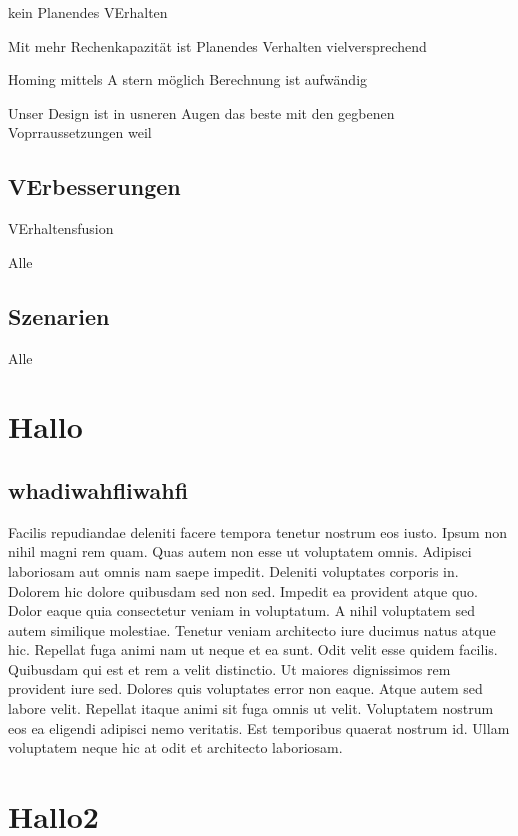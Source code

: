 \documentclass[
a4paper,     %
12pt         %
]{scrartcl}  %
\begin{document}
kein Planendes VErhalten

Mit mehr Rechenkapazität ist Planendes Verhalten vielversprechend


Homing mittels A stern möglich
Berechnung ist aufwändig

Unser Design ist in usneren Augen das beste mit den gegbenen Voprraussetzungen weil




\subsection{VErbesserungen}

VErhaltensfusion

Alle
\subsection{Szenarien}
Alle




\section{Hallo}
\subsection{whadiwahfliwahfi}
Facilis repudiandae deleniti facere tempora tenetur nostrum eos iusto. Ipsum non nihil magni rem quam. Quas autem non esse ut voluptatem omnis.
Adipisci laboriosam aut omnis nam saepe impedit. Deleniti voluptates corporis in. Dolorem hic dolore quibusdam sed non sed.
Impedit ea provident atque quo. Dolor eaque quia consectetur veniam in voluptatum. A nihil voluptatem sed autem similique molestiae. Tenetur veniam architecto iure ducimus natus atque hic. Repellat fuga animi nam ut neque et ea sunt. Odit velit esse quidem facilis.
Quibusdam qui est et rem a velit distinctio. Ut maiores dignissimos rem provident iure sed. Dolores quis voluptates error non eaque. Atque autem sed labore velit. Repellat itaque animi sit fuga omnis ut velit.
Voluptatem nostrum eos ea eligendi adipisci nemo veritatis. Est temporibus quaerat nostrum id. Ullam voluptatem neque hic at odit et architecto laboriosam.
\section{Hallo2}










% 

% 
\end{document}
